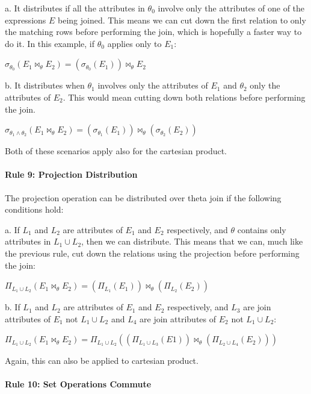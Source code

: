 a. It distributes if all the attributes in $\theta_{0}$ involve only the attributes of one of the expressions $E$ being joined. This means we can cut down the first relation to only the matching rows before performing the join, which is hopefully a faster way to do it. In this example, if $\theta_{0}$ applies only to $E_{1}$:

$\sigma_{\theta_{0}}(E_{1} \bowtie_{\theta} E_{2}) = (\sigma_{\theta_{0}}(E_{1})) \bowtie_{\theta} E_{2}$ 

b. It distributes when $\theta_{1}$ involves only the attributes of $E_{1}$ and $\theta_{2}$ only the attributes of $E_{2}$. This would mean cutting down both relations before performing the join.

$\sigma_{\theta_{1}\wedge\theta_{2}} (E_{1} \bowtie_{\theta} E_{2}) = (\sigma_{\theta_{1}}(E_{1})) \bowtie_{\theta} (\sigma_{\theta_{2}}(E_{2})) $

Both of these scenarios apply also for the cartesian product.

\paragraph{Rule 9: Projection Distribution}
The projection operation can be distributed over theta join if the following conditions hold:

a. If $L_{1}$ and $L_{2}$ are attributes of $E_{1}$ and $E_{2}$ respectively, and $\theta$ contains only attributes in $L_{1} \cup L_{2}$, then we can distribute. This means that we can, much like the previous rule, cut down the relations using the projection before performing the join:

$\Pi_{L_{1} \cup L_{2}}( E_{1} \bowtie_{\theta} E_{2} ) = (\Pi_{L_{1}}(E_{1})) \bowtie_{\theta} (\Pi_{L_{2}}(E_{2}))$

b. If $L_{1}$ and $L_{2}$ are attributes of $E_{1}$ and $E_{2}$ respectively, and $L_{3}$ are join attributes of $E_{1}$ not $L_{1} \cup L_{2}$ and $L_{4}$ are join attributes of $E_{2}$ not $L_{1} \cup L_{2}$:

$\Pi_{L_{1} \cup L_{2}} (E_{1} \bowtie_{\theta} E_{2}) = \Pi_{L_{1} \cup L_{2}}((\Pi_{L_{1} \cup L_{3}}(E1)) \bowtie_{\theta} (\Pi_{L_{2} \cup L_{4}}(E_{2})))$

Again, this can also be applied to cartesian product.

\paragraph{Rule 10: Set Operations Commute}


